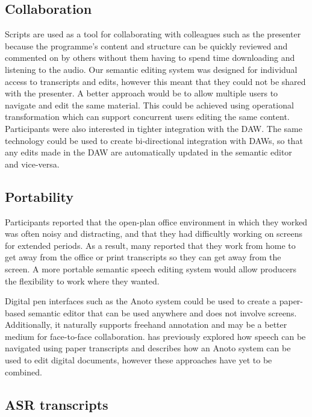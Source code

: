 \subsection{Collaboration}

Scripts are used as a tool for collaborating with colleagues such as the
presenter because the programme's content and structure can be quickly reviewed and
commented on by others without them having to spend time downloading and listening to the audio. Our semantic editing
system was designed for individual access to transcripts and edits, however this meant that they could not be shared
with the presenter. A better approach would be to allow multiple users to navigate and edit the same material. This
could be achieved using operational transformation \citep{Sun2004} which can support concurrent users editing the same
content. Participants were also interested in tighter integration with the DAW. The same technology could be used
to create bi-directional integration with DAWs, so that any edits made in the DAW are automatically updated in the
semantic editor and vice-versa.

\subsection{Portability}

Participants reported that the open-plan office environment in which they worked was often noisy and distracting, and
that they had difficultly working on screens for extended periods. As a result, many reported that they work from home
to get away from the office or print transcripts so they can get away from the screen. A more portable semantic speech
editing system would allow producers the flexibility to work where they wanted.

Digital pen interfaces such as the Anoto system could be used to create a paper-based semantic editor that can be used
anywhere and does not involve screens. Additionally, it naturally supports freehand annotation and may be a better
medium for face-to-face collaboration.  \citet{Klemmer2003} has previously explored how speech can be navigated using
paper transcripts and \citet{Weibel2008} describes how an Anoto system can be used to edit digital documents, however
these approaches have yet to be combined.

\subsection{ASR transcripts}

